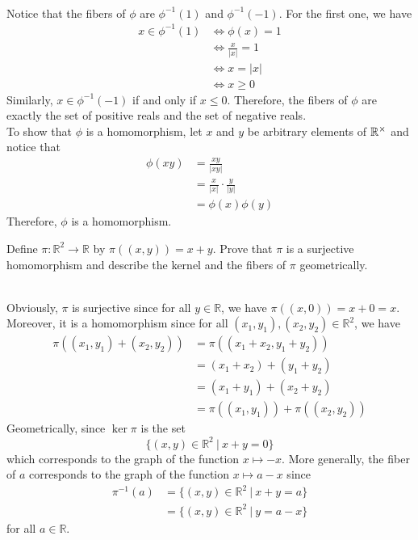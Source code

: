 \begin{solution}
    \\ Notice that the fibers of $\phi$ are $\phi^{-1}(1)$ and $\phi^{-1}(-1)$. For the first one, we have
    \begin{align*}
        x \in \phi^{-1}(1) &\iff \phi(x) = 1 \\
        &\iff \frac{x}{|x|} = 1 \\
        &\iff x = |x| \\
        &\iff x \geq 0
    \end{align*}
    Similarly, $x \in \phi^{-1}(-1)$ if and only if $x \leq 0$. Therefore, the fibers of $\phi$ are exactly the set of positive reals and the set of negative reals. \\
    To show that $\phi$ is a homomorphism, let $x$ and $y$ be arbitrary elements of $\mathbb{R}^{\times}$ and notice that
    \begin{align*}
        \phi(xy) &= \frac{xy}{|xy|} \\
        &= \frac{x}{|x|}\cdot \frac{y}{|y|} \\
        &= \phi(x)\phi(y)
    \end{align*}
    Therefore, $\phi$ is a homomorphism.\\
\end{solution}

\begin{exercise}
    Define $\pi : \mathbb{R}^2 \to \mathbb{R}$ by $\pi((x,y)) = x + y$. Prove that $\pi$ is a surjective homomorphism and describe the kernel and the fibers of $\pi$ geometrically. \\
\end{exercise} 

\begin{solution}
    \\ Obviously, $\pi$ is surjective since for all $y \in \mathbb{R}$, we have $\pi((x,0)) = x + 0 = x$. Moreover, it is a homomorphism since for all $(x_1,y_1),(x_2, y_2) \in \mathbb{R}^2$, we have 
    \begin{align*}
        \pi((x_1, y_1) + (x_2, y_2)) &= \pi((x_1 + x_2, y_1 + y_2)) \\
        &= (x_1 + x_2) + (y_1 + y_2) \\
        &= (x_1 + y_1) + (x_2 + y_2) \\
        &= \pi((x_1, y_1)) + \pi((x_2, y_2))
    \end{align*}
    Geometrically, since $\ker\pi$ is the set 
    $$\{(x,y) \in \mathbb{R}^2 \ | \ x + y = 0\}$$
    which corresponds to the graph of the function $x \mapsto -x$. More generally, the fiber of $a$ corresponds to the graph of the function $x \mapsto a - x$ since 
    \begin{align*}
        \pi^{-1}(a) &= \{(x,y) \in \mathbb{R}^2 \ | \ x + y = a\} \\
        &= \{(x,y) \in \mathbb{R}^2 \ | \ y = a -x\}
    \end{align*}
    for all $a \in \mathbb{R}$.\\
\end{solution}

